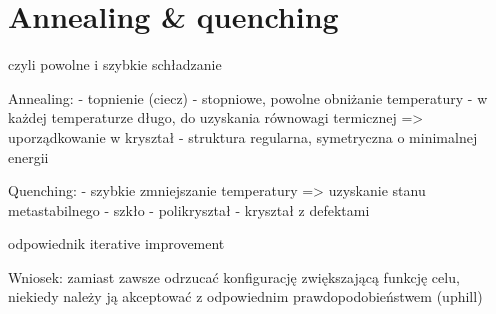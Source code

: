 \section{Annealing & quenching}

czyli powolne i szybkie schładzanie

Annealing:
- topnienie (ciecz)
- stopniowe, powolne obniżanie temperatury
- w każdej temperaturze długo, do uzyskania równowagi termicznej
=> uporządkowanie w kryształ - struktura regularna, symetryczna o minimalnej energii

Quenching:
- szybkie zmniejszanie temperatury
=> uzyskanie stanu metastabilnego
- szkło
- polikryształ
- kryształ z defektami

odpowiednik iterative improvement

Wniosek: zamiast zawsze odrzucać konfigurację zwiększającą funkcję celu, niekiedy należy ją akceptować z odpowiednim prawdopodobieństwem (uphill)